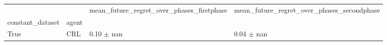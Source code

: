 \begin{tabular}{llll}
\toprule
 &  & mean_future_regret_over_phases_firstphase & mean_future_regret_over_phases_secondphase \\
constant_dataset & agent &  &  \\
\midrule
True & CRL & 0.10 $\pm$ nan & 0.04 $\pm$ nan \\
\cline{1-4}
\bottomrule
\end{tabular}

